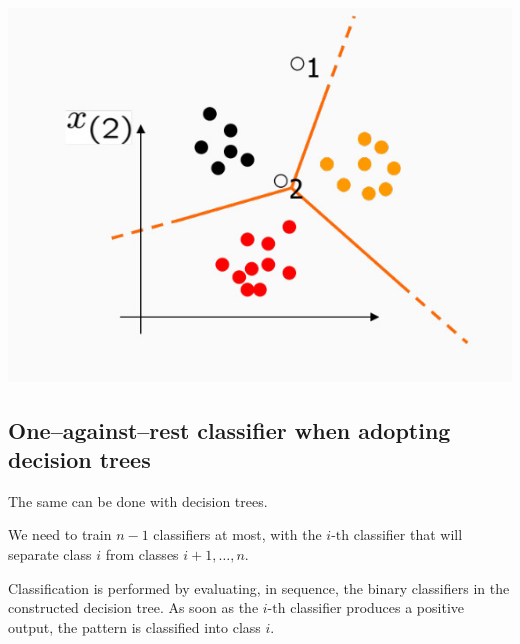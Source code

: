 \documentclass[10pt]{report}
\begin{document}
\begin{center}
\includegraphics[scale=0.25]{./pics/svm/svm-ovr-2.jpg}
\end{center}

\subsection{One--against--rest classifier when adopting decision trees}
\label{sec:orge01c636}
The same can be done with decision trees.

We need to train \(n-1\) classifiers at most, with the \(i\mbox{-th}\) classifier that will
separate class \(i\) from classes \(i + 1, \dots, n\).

Classification is performed by evaluating, in sequence, the binary classifiers
in the constructed decision tree. As soon as the \(i\mbox{-th}\) classifier produces a
positive output, the pattern is classified into class \(i\).
\end{document}
